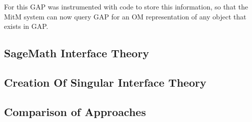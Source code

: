 For this GAP was instrumented with code to store this information, so that the
MitM system can now query GAP for an OM representation of any object that exists
in GAP.

\subsection{SageMath Interface Theory}

\subsection{Creation Of Singular Interface Theory}

\subsection{Comparison of Approaches}

